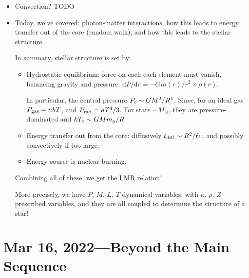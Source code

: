 \documentclass[11pt,
        usenames, %
        dvipsnames %
    ]{article}
\newcommand*{\rdil}[2]{\mathrm{d}#1 / \mathrm{d}#2}
\begin{document}
\begin{itemize}
    \item Convection? TODO

    \item Today, we've covered: photon-matter interactions, how this leads to
        energy transfer out of the core (random walk), and how this leads to the
        stellar structure.

        In summary, stellar structure is set by:
        \begin{itemize}
            \item Hydrostatic equilibrium: force on each each element must
                vanish, balancing gravity and pressure: $\rdil{P}{r} =
                -Gm(r)/r^2 \times \rho(r)$.

                In particular, the central pressure $P_{\rm c} \sim GM^2/R^4$.
                Since, for an ideal gas $P_{\rm gas} = nkT$, and $P_{\rm rad} =
                aT^4/3$. For stars $\sim M_{\odot}$, they are pressure-dominated
                and $kT_{\rm c} \sim GMm_{\rm p} / R$

            \item Energy transfer out from the core: diffusively $t_{\rm diff}
                \sim R^2 / \ell c$, and possibly convectively if too large.

            \item Energy source is nuclear burning.
        \end{itemize}
        Combining all of these, we get the LMR relation!

        More precisely, we have $P$, $M$, $L$, $T$ dynamical variables, with
        $\kappa$, $\rho$, $Z$ prescribed variables, and they are all coupled to
        determine the structure of a star!
\end{itemize}

\section{Mar 16, 2022---Beyond the Main Sequence}
\end{document}
